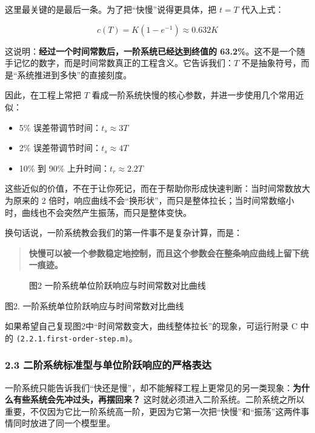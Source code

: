 \documentclass[
  11pt]{article}
\providecommand{\tightlist}{%
  \setlength{\itemsep}{0pt}\setlength{\parskip}{0pt}}
\begin{document}
这里最关键的是最后一条。为了把``快慢''说得更具体，把 \(t=T\) 代入上式：

\[
c(T) = K\left(1-e^{-1}\right) \approx 0.632K
\]

这说明：\textbf{经过一个时间常数后，一阶系统已经达到终值的
63.2\%}。这不是一个随手记忆的数字，而是时间常数真正的工程含义。它告诉我们：\(T\)
不是抽象符号，而是``系统推进到多快''的直接刻度。

因此，在工程上常把 \(T\)
看成一阶系统快慢的核心参数，并进一步使用几个常用近似：

\begin{itemize}
\tightlist
\item
  5\% 误差带调节时间：\(t_s \approx 3T\)
\item
  2\% 误差带调节时间：\(t_s \approx 4T\)
\item
  10\% 到 90\% 上升时间：\(t_r \approx 2.2T\)
\end{itemize}

这些近似的价值，不在于让你死记，而在于帮助你形成快速判断：当时间常数放大为原来的
2
倍时，响应曲线不会``换形状''，而只是整体拉长；当时间常数缩小时，曲线也不会突然产生振荡，而只是整体变快。

换句话说，一阶系统教会我们的第一件事不是复杂计算，而是：

\begin{quote}
\textbf{快慢可以被一个参数稳定地控制，而且这个参数会在整条响应曲线上留下统一痕迹。}
\end{quote}

\begin{figure}
\centering

\caption{图2 一阶系统单位阶跃响应与时间常数对比曲线}
\end{figure}

图2. 一阶系统单位阶跃响应与时间常数对比曲线

如果希望自己复现图2中``时间常数变大，曲线整体拉长''的现象，可运行附录 C
中的 \texttt{(2.2.1.first-order-step.m)}。

\subsubsection{2.3
二阶系统标准型与单位阶跃响应的严格表达}\label{ux4e8cux9636ux7cfbux7edfux6807ux51c6ux578bux4e0eux5355ux4f4dux9636ux8dc3ux54cdux5e94ux7684ux4e25ux683cux8868ux8fbe}

一阶系统只能告诉我们``快还是慢''，却不能解释工程上更常见的另一类现象：\textbf{为什么有些系统会先冲过头，再摆回来？}
这时就必须进入二阶系统。二阶系统之所以重要，不仅因为它比一阶系统高一阶，更因为它第一次把``快慢''和``振荡''这两件事情同时放进了同一个模型里。
\end{document}
